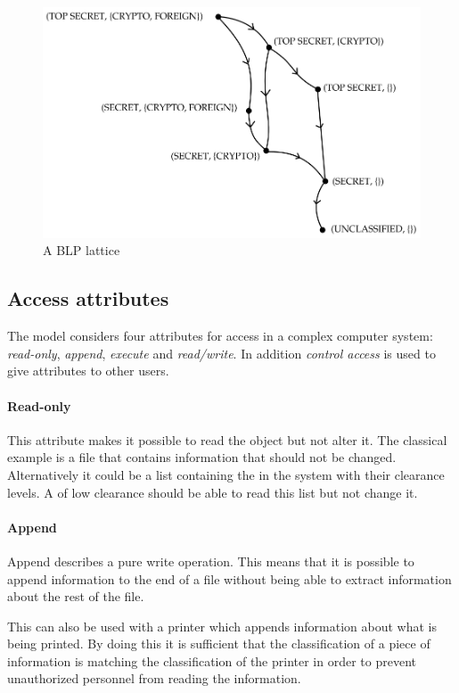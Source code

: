 \begin{figure}
\centering
\includegraphics[width=\textwidth]{figures/blp_lattice}
\caption{A BLP lattice \cite{security_engineering_ross_anderson}}
\label{blp:lattice}
\end{figure}

\subsection{Access attributes}
The model considers four attributes for access in a complex computer system: \emph{read-only}, \emph{append}, \emph{execute} and \emph{read/write}.
In addition \emph{control access} is used to give attributes to other users.

\paragraph{Read-only}
This attribute makes it possible to read the object but not alter it.
The classical example is a file that contains information that should not be changed.
Alternatively it could be a list containing the \principals{} in the system with their clearance levels.
A \principal{} of low clearance should be able to read this list but not change it.

\paragraph{Append}
Append describes a pure write operation.
This means that it is possible to append information to the end of a file without being able to extract information about the rest of the file.

This can also be used with a printer which appends information about what is being printed.
By doing this it is sufficient that the classification of a piece of information is matching the classification of the printer in order to prevent unauthorized personnel from reading the information.

